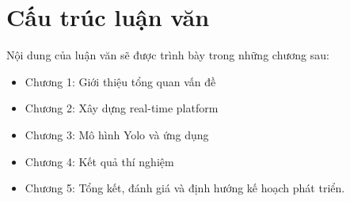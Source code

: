 \section{Cấu trúc luận văn}
Nội dung của luận văn sẽ được trình bày trong những chương sau:
\begin{itemize}
\item Chương 1: Giới thiệu tổng quan vấn đề
\item Chương 2: Xây dựng real-time platform
\item Chương 3: Mô hình Yolo và ứng dụng
\item Chương 4: Kết quả thí nghiệm
\item Chương 5: Tổng kết, đánh giá và định hướng kế hoạch phát triển.
\end{itemize}
